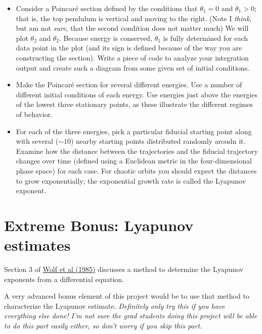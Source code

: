 \documentclass[11pt, preprint]{aastex}
\begin{document}
\begin{itemize}
\item Consider a Poincar{\'e} section defined by the conditions that
  $\theta_1=0$ and $\dot\theta_1>0$; that is, the top pendulum is
  vertical and moving to the right.  (Note I {\it think}, but am not
  {\it sure}, that the second condition does not matter much) We will
  plot $\theta_2$ and $\dot\theta_2$. Because energy is conserved,
  $\dot\theta_1$ is fully determined for each data point in the plot
  (and its sign is defined because of the way you are constructing the
  section). Write a piece of code to analyze your
  integration output and create such a diagram from some given set of
  initial conditions.
 \item Make the Poincar{\'e} section for several different
   energies. Use a number of different initial conditions of each
   energy. Use energies just above the energies of the lowest three
   stationary points, as these illustrate the different regimes of
   behavior.
\item For each of the three energies, pick a particular fiducial
  starting point along with several ($\sim 10$) nearby starting points
  distributed randomly aroudn it. Examine how the distance between the
  trajectories and the fiducial trajectory changes over time (defined
  using a Euclidean metric in the four-dimensional phase space) for
  each case. For chaotic orbits you should expect the distances to
  grow exponentially; the exponential growth rate is called the
  Lyapunov exponent.
\end{itemize}

\section{Extreme Bonus: Lyapunov estimates}

Section 3 of
\href{https://www.sciencedirect.com/science/article/pii/0167278985900119}{Wolf
  et al (1985)} discusses a method to determine the Lyapunov exponents
from a differential equation.

A very advanced bonus element of this project would be to use that
method to characterize the Lyapunov estimate. {\it Definitely only try
  this if you have everything else done! I'm not sure the grad
  students doing this project will be able to do this part easily
  either, so don't worry if you skip this part.}
\end{document}

